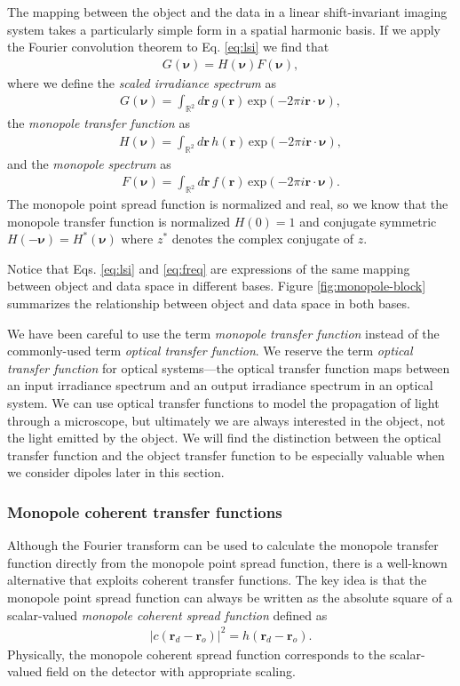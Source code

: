 \documentclass[]{osa-article}
\providecommand{\mb}[1]{\mathbf{#1}}
\providecommand{\ro}{\mathbf{\mathbf{r}}_o}
\providecommand{\rd}{\mathbf{r}_d}
\providecommand{\mbb}[1]{\mathbb{#1}}
\providecommand{\bs}[1]{\boldsymbol{#1}}
\providecommand{\bv}{\bs{\nu}}
\begin{document}
The mapping between the object and the data in a linear shift-invariant imaging
system takes a particularly simple form in a spatial harmonic basis. If we apply
the Fourier convolution theorem to Eq. \ref{eq:lsi} we find that
\begin{align}
  G(\bv) = H(\bv)F(\bv),\label{eq:freq}
\end{align}
where we define the \textit{scaled irradiance spectrum} as
\begin{align}
  G(\bv) = \int_{\mbb{R}^2}d\mb{r}\, g(\mb{r})\, \text{exp}(-2\pi i\mb{r}\cdot\bv),
\end{align}
the \textit{monopole transfer function} as
\begin{align}
  H(\bv) = \int_{\mbb{R}^2}d\mb{r}\, h(\mb{r})\, \text{exp}(-2\pi i\mb{r}\cdot\bv),\label{eq:otf}
\end{align}
and the \textit{monopole spectrum} as
\begin{align}
    F(\bv) = \int_{\mbb{R}^2}d\mb{r}\, f(\mb{r})\, \text{exp}(-2\pi i\mb{r}\cdot\bv).
\end{align}
The monopole point spread function is normalized and real, so we know
that the monopole transfer function is normalized $H(0) = 1$ and
conjugate symmetric $H(-\bv) = H^*(\bv)$ where $z^*$ denotes the complex
conjugate of $z$.

Notice that Eqs. \ref{eq:lsi} and \ref{eq:freq} are expressions of the same
mapping between object and data space in different bases. Figure
\ref{fig:monopole-block} summarizes the relationship between object and data
space in both bases.

We have been careful to use the term \textit{monopole transfer function} instead
of the commonly-used term \textit{optical transfer function}. We reserve the
term \textit{optical transfer function} for optical systems---the optical
transfer function maps between an input irradiance spectrum and an output
irradiance spectrum in an optical system. We can use optical transfer functions
to model the propagation of light through a microscope, but ultimately we are
always interested in the object, not the light emitted by the object. We will
find the distinction between the optical transfer function and the object
transfer function to be especially valuable when we consider dipoles later in
this section.

\subsubsection{Monopole coherent transfer functions}
Although the Fourier transform can be used to calculate the monopole transfer
function directly from the monopole point spread function, there is a well-known
alternative that exploits coherent transfer functions. The key idea is that the
monopole point spread function can always be written as the absolute square of a
scalar-valued \textit{monopole coherent spread function} defined as
\begin{align}
  |c(\rd - \ro)|^2 = h(\rd - \ro). \label{eq:absquarescalar}
\end{align}
Physically, the monopole coherent spread function corresponds to the
scalar-valued field on the detector with appropriate scaling.
\end{document}
